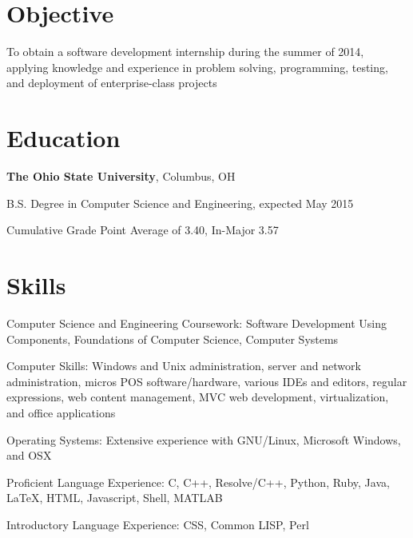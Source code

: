\documentclass[letterpaper]{resume}
\begin{document}
\author{Christopher John Wallace}
\maketitle

\section{Objective}
\begin{compactitem}
\item
	To obtain a software development internship during the summer of 2014, applying
	knowledge and experience in problem solving, programming, testing, and
	deployment of enterprise-class projects
\end{compactitem}

\section{Education}
\textbf{The Ohio State University}, Columbus, OH

\begin{compactitem}
\item B.S. Degree in Computer Science and Engineering, expected May 2015
\item Cumulative Grade Point Average of 3.40, In-Major 3.57
\end{compactitem}

\section{Skills}

\begin{compactitem}
\item Computer Science and Engineering Coursework:
	Software Development Using Components, Foundations of Computer Science,
	Computer Systems

\item Computer Skills: Windows and Unix administration, server and network
	administration, micros POS software/hardware, various IDEs and editors,
	regular expressions, web content management, MVC web development,
	virtualization, and office applications

\item Operating Systems: Extensive experience with GNU/Linux,
	Microsoft Windows, and OSX

\item Proficient Language Experience: C, C++, Resolve/C++, Python, Ruby, Java,
	\LaTeX, HTML, Javascript, Shell, MATLAB
\item Introductory Language Experience: CSS, Common LISP, Perl

\end{compactitem}
\end{document}

